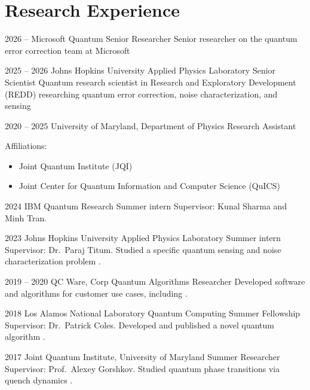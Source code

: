\section{Research Experience}

\cventry
  {2026 --}
  {Microsoft Quantum}
  {Senior Researcher}
  {}
  {}
  {
  Senior researcher on the quantum error correction team at Microsoft
  }

\cventry
  {2025 -- 2026}
  {Johns Hopkins University Applied Physics Laboratory}
  {Senior Scientist}
  {}
  {}
  {
  Quantum research scientist in Research and Exploratory Development (REDD) researching quantum error correction, noise characterization, and sensing
  }


\cventry
  {2020 -- 2025}
  {University of Maryland, Department of Physics}
  {Research Assistant}
  {}
  {}
  {
    Affiliations:
    \begin{itemize}
        \item Joint Quantum Institute (JQI)
        \item Joint Center for Quantum Information and Computer Science (QuICS)
    \end{itemize}
  }


\cventry
  {2024}
  {IBM Quantum Research}
  {Summer intern}
  {}
  {}
  {Supervisor: Kunal Sharma and Minh Tran.}


\cventry
  {2023}
  {Johns Hopkins University Applied Physics Laboratory}
  {Summer intern}
  {}
  {}
  {Supervisor: Dr.~Paraj Titum. Studied a specific quantum sensing and noise characterization problem \cite{iosue2026superresolution}.}


\cventry
  {2019 -- 2020}
  {QC Ware, Corp}
  {Quantum Algorithms Researcher}
  {}
  {}
  {Developed software and algorithms for customer use cases, including \cite{parrish2019a-jacobi-diagon}.}
  

\cventry
  {2018}
  {Los Alamos National Laboratory}
  {Quantum Computing Summer Fellowship}
  {}
  {}
  {Supervisor: Dr.~Patrick Coles. Developed and published a novel quantum algorithm \cite{cirstoiu2020variational-fas}.}


\cventry
  {2017}
  {Joint Quantum Institute, University of Maryland}
  {Summer Researcher}
  {}
  {}
  {Supervisor: Prof.~Alexey Gorshkov. Studied quantum phase transitions via quench dynamics \cite{titum2019probing-ground-}.}


  
